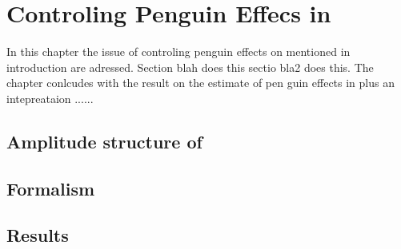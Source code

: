 
\chapter{Controling Penguin Effecs in \phis}
\label{Penguins}

In this chapter the issue of controling penguin effects on \phis mentioned in introduction are adressed.
Section blah does this sectio bla2 does this. The chapter conlcudes with the result on the estimate of pen guin effects in \phis
plus an intepreataion ......

\section{Amplitude structure of \BsJpsiPhi}
\label{jpsiphi_amp_struct}


\section{Formalism}
\label{penguin_formalism}


\section{Results}
\label{penguin_results}

